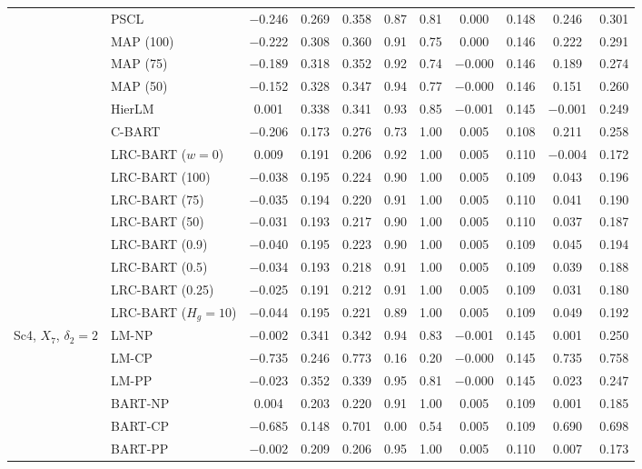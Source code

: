 \documentclass[11pt]{article}
\theoremstyle{definition}
\theoremstyle{plain}
\begin{document}
\begin{center}
\begin{longtable}{llccccccccc}
& PSCL & $-$0.246 & 0.269 & 0.358 & 0.87 & 0.81 & 0.000 & 0.148 & 0.246 & 0.301 \\
& MAP (100) & $-$0.222 & 0.308 & 0.360 & 0.91 & 0.75 & 0.000 & 0.146 & 0.222 & 0.291 \\
& MAP (75) & $-$0.189 & 0.318 & 0.352 & 0.92 & 0.74 & $-$0.000 & 0.146 & 0.189 & 0.274 \\
& MAP (50) & $-$0.152 & 0.328 & 0.347 & 0.94 & 0.77 & $-$0.000 & 0.146 & 0.151 & 0.260 \\
& HierLM & 0.001 & 0.338 & 0.341 & 0.93 & 0.85 & $-$0.001 & 0.145 & $-$0.001 & 0.249 \\
& C-BART & $-$0.206 & 0.173 & 0.276 & 0.73 & 1.00 & 0.005 & 0.108 & 0.211 & 0.258 \\
& LRC-BART ($w=0$) & 0.009 & 0.191 & 0.206 & 0.92 & 1.00 & 0.005 & 0.110 & $-$0.004 & 0.172 \\
& LRC-BART (100) & $-$0.038 & 0.195 & 0.224 & 0.90 & 1.00 & 0.005 & 0.109 & 0.043 & 0.196 \\
& LRC-BART (75) & $-$0.035 & 0.194 & 0.220 & 0.91 & 1.00 & 0.005 & 0.110 & 0.041 & 0.190 \\
& LRC-BART (50) & $-$0.031 & 0.193 & 0.217 & 0.90 & 1.00 & 0.005 & 0.110 & 0.037 & 0.187 \\
& LRC-BART (0.9) & $-$0.040 & 0.195 & 0.223 & 0.90 & 1.00 & 0.005 & 0.109 & 0.045 & 0.194 \\
& LRC-BART (0.5) & $-$0.034 & 0.193 & 0.218 & 0.91 & 1.00 & 0.005 & 0.109 & 0.039 & 0.188 \\
& LRC-BART (0.25) & $-$0.025 & 0.191 & 0.212 & 0.91 & 1.00 & 0.005 & 0.109 & 0.031 & 0.180 \\
& LRC-BART ($H_g=10$) & $-$0.044 & 0.195 & 0.221 & 0.89 & 1.00 & 0.005 & 0.109 & 0.049 & 0.192 \\
\midrule
\multirow{20}{*}{Sc4, $X_7$, $\delta_2=2$} & LM-NP & $-$0.002 & 0.341 & 0.342 & 0.94 & 0.83 & $-$0.001 & 0.145 & 0.001 & 0.250 \\
& LM-CP & $-$0.735 & 0.246 & 0.773 & 0.16 & 0.20 & $-$0.000 & 0.145 & 0.735 & 0.758 \\
& LM-PP & $-$0.023 & 0.352 & 0.339 & 0.95 & 0.81 & $-$0.000 & 0.145 & 0.023 & 0.247 \\
& BART-NP & 0.004 & 0.203 & 0.220 & 0.91 & 1.00 & 0.005 & 0.109 & 0.001 & 0.185 \\
& BART-CP & $-$0.685 & 0.148 & 0.701 & 0.00 & 0.54 & 0.005 & 0.109 & 0.690 & 0.698 \\
& BART-PP & $-$0.002 & 0.209 & 0.206 & 0.95 & 1.00 & 0.005 & 0.110 & 0.007 & 0.173 \\

\end{longtable}
\end{center}
\end{document}
